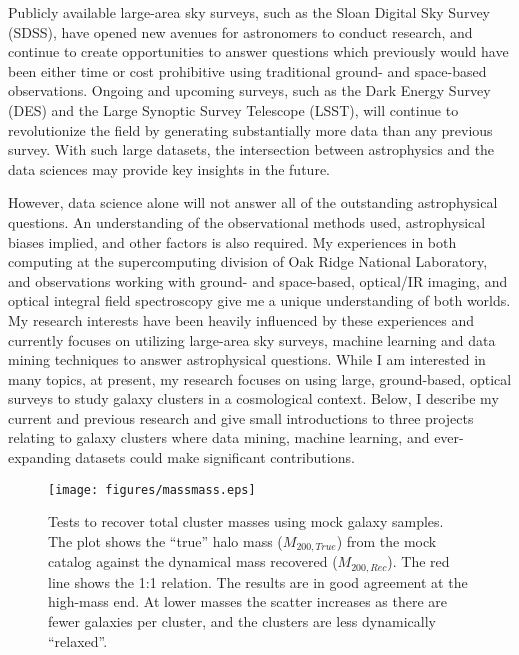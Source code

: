 \documentclass[overlapped, line, 11pt]{res}
\begin{document}

\begin{resume}
\noindent Publicly available large-area sky surveys, such as the Sloan Digital Sky Survey (SDSS), have opened new avenues for astronomers to conduct research, and continue to create opportunities to answer questions which previously would have been either time or cost prohibitive using traditional ground- and space-based observations. Ongoing and upcoming surveys, such as the Dark Energy Survey (DES) and the Large Synoptic Survey Telescope (LSST), will continue to revolutionize the field by generating substantially more data than any previous survey. With such large datasets, the intersection between astrophysics and the data sciences may provide key insights in the future.

However, data science alone will not answer all of the outstanding astrophysical questions. An understanding of the observational methods used, astrophysical biases implied, and other factors is also required. My experiences in both computing at the supercomputing division of Oak Ridge National Laboratory, and observations working with ground- and space-based, optical/IR imaging, and optical integral field spectroscopy give me a unique understanding of both worlds. My research interests have been heavily influenced by these experiences and currently focuses on utilizing large-area sky surveys, machine learning and data mining techniques to answer astrophysical questions. While I am interested in many topics, at present, my research focuses on using large, ground-based, optical surveys to study galaxy clusters in a cosmological context. Below, I describe my current and previous research and give small introductions to three projects relating to galaxy clusters where data mining, machine learning, and ever-expanding datasets could make significant contributions.

\begin{wrapfigure}[21]{r}{0.45\textwidth}
	\vspace*{-1.6cm}
	\centering
	\texttt{[image: figures/massmass.eps]}
	\vspace*{-0.75cm}
	\caption{Tests to recover total cluster masses using mock galaxy samples. The plot shows the “true” halo mass ($M_{200,True}$) from the mock catalog against the dynamical mass recovered ($M_{200,Rec}$). The red line shows the 1:1 relation. The results are in good agreement at the high-mass end. At lower masses the scatter increases as there are fewer galaxies per cluster, and the clusters are less dynamically ``relaxed''.}
	\label{fig:massmass}
\end{wrapfigure}


\end{resume}
\end{document}
